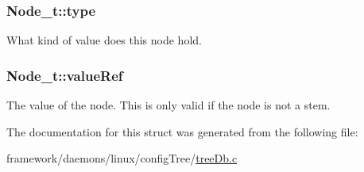\subsubsection[{\texorpdfstring{type}{type}}]{ Node\+\_\+t\+::type}\hypertarget{struct_node__t_ad9bf3285198ae587caf0fd3922420d35}{}\label{struct_node__t_ad9bf3285198ae587caf0fd3922420d35}


What kind of value does this node hold. 

\subsubsection[{\texorpdfstring{value\+Ref}{valueRef}}]{ Node\+\_\+t\+::value\+Ref}\hypertarget{struct_node__t_a6d03e74388f5585c697f142a1bcdf2d2}{}\label{struct_node__t_a6d03e74388f5585c697f142a1bcdf2d2}
The value of the node. This is only valid if the node is not a stem. 

The documentation for this struct was generated from the following file\+:\begin{DoxyCompactItemize}
\item 
framework/daemons/linux/config\+Tree/\hyperlink{tree_db_8c}{tree\+Db.\+c}\end{DoxyCompactItemize}
